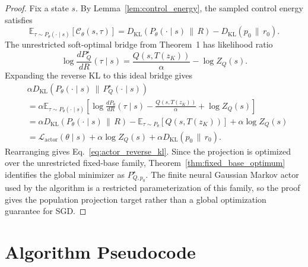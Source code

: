 \documentclass[11pt]{article}
\begin{document}
\begin{proof}
Fix a state $s$. By Lemma~\ref{lem:control_energy}, the sampled control energy satisfies
\begin{equation}
  \mathbb E_{\tau\sim P_\theta(\cdot\mid s)}
  \left[
    \mathcal C_\theta(s,\tau)
  \right]
  =
  D_{\mathrm{KL}}
  \left(
    P_\theta(\cdot\mid s)
    \,\|\,R
  \right)
  -
  D_{\mathrm{KL}}
  \left(
    p_0
    \,\|\,
    r_0
  \right).
\end{equation}
The unrestricted soft-optimal bridge from Theorem~1 has likelihood ratio
\begin{equation}
  \log
  \frac{
    dP_Q^\star
  }{
    dR
  }(\tau\mid s)
  =
  \frac{
    Q(s,T(z_K))
  }{
    \alpha
  }
  -
  \log Z_Q(s).
\end{equation}
Expanding the reverse KL to this ideal bridge gives
\begin{align}
  &\alpha
  D_{\mathrm{KL}}
  \left(
    P_\theta(\cdot\mid s)
    \,\|\,P_Q^\star(\cdot\mid s)
  \right)
  \nonumber\\
  &=
  \alpha
  \mathbb E_{\tau\sim P_\theta(\cdot\mid s)}
  \left[
    \log
    \frac{
      dP_\theta
    }{
      dR
    }
    (\tau\mid s)
    -
    \frac{
      Q(s,T(z_K))
    }{
      \alpha
    }
    +
    \log Z_Q(s)
  \right]
  \nonumber\\
  &=
  \alpha
  D_{\mathrm{KL}}
  \left(
    P_\theta(\cdot\mid s)
    \,\|\,R
  \right)
  -
  \mathbb E_{\tau\sim P_\theta}
  \left[
    Q(s,T(z_K))
  \right]
  +
  \alpha\log Z_Q(s)
  \nonumber\\
  &=
  \mathcal L_{\mathrm{actor}}(\theta\mid s)
  +
  \alpha\log Z_Q(s)
  +
  \alpha
  D_{\mathrm{KL}}
  \left(
    p_0
    \,\|\,
    r_0
  \right).
\end{align}
Rearranging gives Eq.~\eqref{eq:actor_reverse_kl}. Since the projection is optimized over the unrestricted fixed-base family, Theorem~\ref{thm:fixed_base_optimum} identifies the global minimizer as $P_{Q,p_0}^\star$. The finite neural Gaussian Markov actor used by the algorithm is a restricted parameterization of this family, so the proof gives the population projection target rather than a global optimization guarantee for SGD.
\end{proof}

\section{Algorithm Pseudocode}
\label{app:pseudocode}
\end{document}
